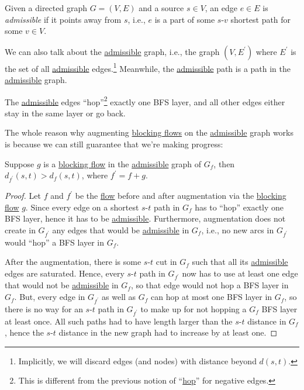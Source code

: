 \begin{definition}[Admissible]\label{def:admissible}
	Given a directed graph \(G = (V, E)\) and a source \(s \in V\), an edge \(e \in E\) is \emph{admissible} if it points away from \(s\), i.e., \(e\) is a part of some \(s\)-\(v\) shortest path for some \(v \in V\).
\end{definition}

We can also talk about the \hyperref[def:admissible]{admissible} graph, i.e., the graph \((V, E^{\prime} )\) where \(E^{\prime} \) is the set of all \hyperref[def:admissible]{admissible} edges.\footnote{Implicitly, we will discard edges (and nodes) with distance beyond \(d(s, t)\).} Meanwhile, the \hyperref[def:admissible]{admissible} path is a path in the \hyperref[def:admissible]{admissible} graph.

\begin{note}
	The \hyperref[def:admissible]{admissible} edges ``hop''\footnote{This is different from the previous notion of ``\hyperref[not:hop]{hop}'' for negative edges.} exactly one BFS layer, and all other edges either stay in the same layer or go back.
\end{note}

The whole reason why augmenting \hyperref[def:blocking-flow]{blocking flows} on the \hyperref[def:admissible]{admissible} graph works is because we can still guarantee that we're making progress:

\begin{lemma}\label{lma:blocking-flow-progress}
	Suppose \(g\) is a \hyperref[def:blocking-flow]{blocking flow} in the \hyperref[def:admissible]{admissible} graph of \(G_f\), then \(d_{f^{\prime} }(s, t) > d_f(s, t)\), where \(f^{\prime} = f + g\).
\end{lemma}
\begin{proof}
	Let \(f\) and \(f^{\prime} \) be the \hyperref[def:flow]{flow} before and after augmentation via the \hyperref[def:blocking-flow]{blocking flow} \(g\). Since every edge on a shortest \(s\)-\(t\) path in \(G_f\) has to ``hop'' exactly one BFS layer, hence it has to be \hyperref[def:admissible]{admissible}. Furthermore, augmentation does not create in \(G_{f^{\prime} }\) any edges that would be \hyperref[def:admissible]{admissible} in \(G_f\), i.e., no new arcs in \(G_{f^{\prime} }\) would ``hop'' a BFS layer in \(G_f\).

	After the augmentation, there is some \(s\)-\(t\) cut in \(G_f\) such that all its \hyperref[def:admissible]{admissible} edges are saturated. Hence, every \(s\)-\(t\) path in \(G_{f^{\prime} }\) now has to use at least one edge that would not be \hyperref[def:admissible]{admissible} in \(G_f\), so that edge would not hop a BFS layer in \(G_f\). But, every edge in \(G_{f^{\prime} }\) as well as \(G_f\) can hop at most one BFS layer in \(G_f\), so there is no way for an \(s\)-\(t\) path in \(G_{f^{\prime} }\) to make up for not hopping a \(G_f\) BFS layer at least once. All such paths had to have length larger than the \(s\)-\(t\) distance in \(G_f\), hence the \(s\)-\(t\) distance in the new graph had to increase by at least one.
\end{proof}

